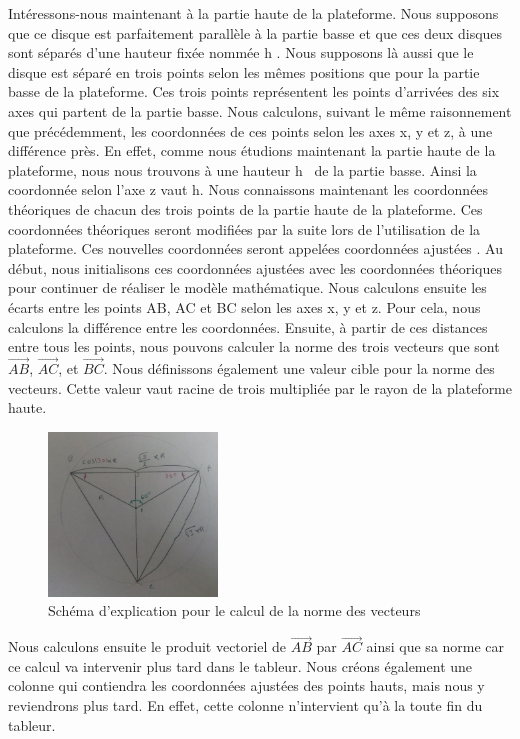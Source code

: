 \documentclass[a4paper,12pt]{article}
\begin{document}
Intéressons-nous maintenant à la partie haute de la plateforme. 
Nous supposons que ce disque est parfaitement parallèle à la partie basse et que ces deux disques sont séparés d’une hauteur fixée nommée \og h \fg . 
Nous supposons là aussi que le disque est séparé en trois points selon les mêmes positions que pour la partie basse de la plateforme. 
Ces trois points représentent les points d’arrivées des six axes qui partent de la partie basse. 
Nous calculons, suivant le même raisonnement que précédemment, les coordonnées de ces points selon les axes x, y et z, à une différence près. 
En effet, comme nous étudions maintenant la partie haute de la plateforme, nous nous trouvons à une hauteur \og h \fg \ de la partie basse. 
Ainsi la coordonnée selon l’axe z vaut h.  
Nous connaissons maintenant les coordonnées théoriques de chacun des trois points de la partie haute de la plateforme. 
Ces coordonnées théoriques seront modifiées par la suite lors de l’utilisation de la plateforme. 
Ces nouvelles coordonnées seront appelées \og coordonnées ajustées \fg . 
Au début, nous initialisons ces coordonnées ajustées avec les coordonnées théoriques pour continuer de réaliser le modèle mathématique.  
Nous calculons ensuite les écarts entre les points AB, AC et BC selon les axes x, y et z. 
Pour cela, nous calculons la différence entre les coordonnées. 
Ensuite, à partir de ces distances entre tous les points, nous pouvons calculer la norme des trois vecteurs que sont $\overrightarrow{AB}$, $\overrightarrow{AC}$, et $\overrightarrow{BC}$. Nous définissons également une valeur cible pour la norme des vecteurs. 
Cette valeur vaut racine de trois multipliée par le rayon de la plateforme haute. 

\begin{figure}[H]
  \centering
  \includegraphics[width=0.4\textwidth]{schema explication.jpg}
  \caption{Schéma d'explication pour le calcul de la norme des vecteurs}
\end{figure}

Nous calculons ensuite le produit vectoriel de $\overrightarrow{AB}$ par $\overrightarrow{AC}$ ainsi que sa norme car ce calcul va intervenir plus tard dans le tableur. 
Nous créons également une colonne qui contiendra les coordonnées ajustées des points hauts, mais nous y reviendrons plus tard. En effet, cette colonne n'intervient qu'à la toute fin du tableur.
\end{document}
